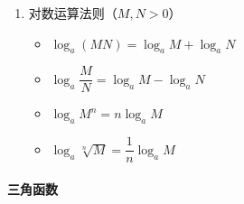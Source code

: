 \documentclass[../book.tex]{subfiles}
\begin{document}
\begin{enumerate}
        \item 对数运算法则（$M, N > 0$）
        \begin{itemize}
            \item $\log_a (MN) = \log_a M + \log_a N$
            \item $\log_a \dfrac{M}{N} = \log_a M - \log_a N$
            \item $\log_a M^n = n\log_a M$
            \item $\log_a \sqrt[n]{M} = \dfrac{1}{n}\log_a M$
        \end{itemize}
    \end{enumerate}

    \paragraph{三角函数}
\end{document}
